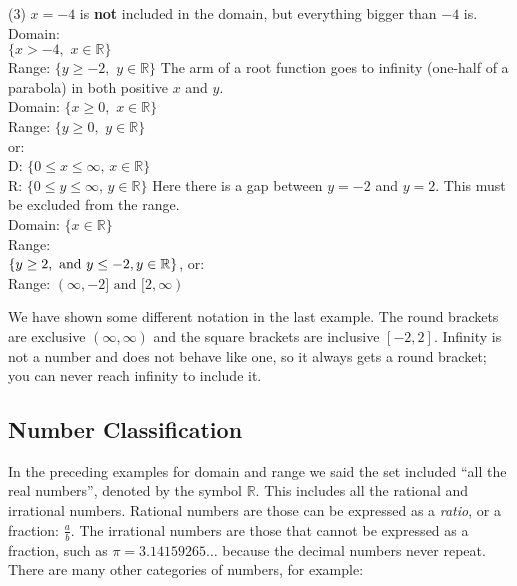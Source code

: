 \begin{tasks}(3)
	\task $x=-4$ is \textbf{not} included in the domain, but everything bigger than $-4$ is.\\ Domain:\\ $\{x>-4,\,\, x\in\mathbb{R}\}$\\ Range: $\{y\ge-2,\,\, y\in\mathbb{R}\}$
	\task The arm of a root function goes to infinity (one-half of a parabola) in both positive $x$ and $y$.\\ Domain: $\{x\ge0,\,\, x\in\mathbb{R}\}$\\ Range: $\{y\ge0,\,\, y\in\mathbb{R}\}$\\or:\\
	D: $\{0\le x\le\infty,\, x\in\mathbb{R}\}$\\
	R: $\{0\le y\le\infty,\, y\in\mathbb{R}\}$
	\task Here there is a gap between $y=-2$ and $y=2$. This must be excluded from the range.\\
	Domain: $\{x\in\mathbb{R}\}$\\
	Range:\\$\{y\ge2,\text{ and } y\le-2,\\y\in\mathbb{R}\}$, or:\\
	Range: $(\infty,-2] \text{ and } [2,\infty)$
\end{tasks}
We have shown some different notation in the last example. The round brackets are exclusive $(\infty,\infty)$ and the square brackets are inclusive $[-2,2]$. Infinity is not a number and does not behave like one, so it always gets a round bracket; you can never reach infinity to include it.

\subsection*{Number Classification}
In the preceding examples for domain and range we said the set included ``all the real numbers'', denoted by the symbol $\mathbb{R}$. This includes all the rational and irrational numbers. Rational numbers are those can be expressed as a \textit{ratio}, or a fraction: $\frac{a}{b}$. The irrational numbers are those that cannot be expressed as a fraction, such as $\pi=3.14159265\dots$ because the decimal numbers never repeat. There are many other categories of numbers, for example:

